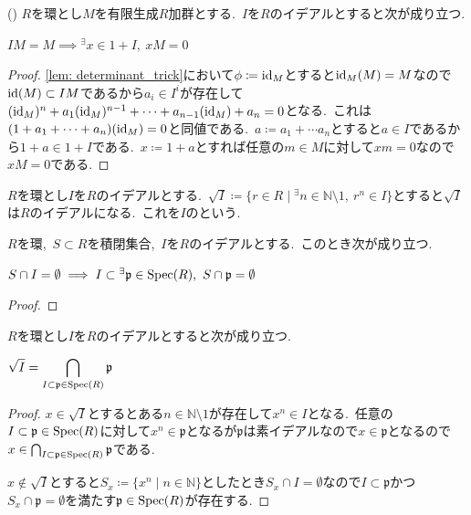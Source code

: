 \begin{theorem}() \label{thm: nakayama_lemma}
$R$を環とし$M$を有限生成$R$加群とする.\
$I$を$R$のイデアルとすると次が成り立つ.
\begin{center}
    $IM = M \implies {^{\exists}x} \in 1 + I,\ xM = 0$
\end{center}
\end{theorem}
\begin{proof}
\cref{lem: determinant_trick}において$\phi \coloneq \operatorname{id}_M$とすると$\operatorname{id}_M(M) = M$なので$\operatorname{id}(M) \subset IM$であるから$a_i \in I^i$が存在して$(\operatorname{id}_M)^n + a_1(\operatorname{id}_M)^{n-1} + \cdots + a_{n-1}(\operatorname{id}_M) + a_n = 0$となる.\
これは$(1 + a_1 + \cdots + a_n)(\operatorname{id}_M) = 0$と同値である.\
$a \coloneq a_1 + \cdots a_n$とすると$a \in I$であるから$1 + a \in 1 + I$である.\
$x \coloneq 1 + a$とすれば任意の$m \in M$に対して$xm = 0$なので$xM = 0$である.
\end{proof}

\begin{definition}
$R$を環とし$I$を$R$のイデアルとする.\
$\sqrt{I} \coloneq \{r \in R \mid {^{\exists}n} \in \mathbb{N} \setminus 1,\ r^n \in I\}$とすると$\sqrt{I}$は$R$のイデアルになる.\
これを$I$のという.
\end{definition}

\begin{lemma}
$R$を環,\ $S \subset R$を積閉集合,\ $I$を$R$のイデアルとする.\
このとき次が成り立つ.
\begin{center}
	$S \cap I = \emptyset \implies I \subset {^{\exists} \mathfrak{p}} \in \operatorname{Spec}(R),\  S \cap \mathfrak{p} = \emptyset$
\end{center}
\end{lemma}
\begin{proof}

\end{proof}

\begin{proposition}
$R$を環とし$I$を$R$のイデアルとすると次が成り立つ.
\begin{center}
    $\displaystyle \sqrt{I} = \bigcap_{I \subset \mathfrak{p} \in \operatorname{Spec}(R)} \mathfrak{p}$
\end{center}
\end{proposition}

\begin{proof}
$x \in \sqrt{I}$とするとある$n \in \mathbb{N} \setminus 1$が存在して$x^n \in I$となる.\
任意の$I \subset \mathfrak{p} \in \operatorname{Spec}(R)$に対して$x^n \in \mathfrak{p}$となるが$\mathfrak{p}$は素イデアルなので$x \in \mathfrak{p}$となるので$x \in \bigcap_{I \subset \mathfrak{p} \in \operatorname{Spec}(R)} \mathfrak{p}$である.

$x \not\in \sqrt{I}$とすると$S_x \coloneq \{x^n \mid n \in \mathbb{N}\}$としたとき$S_x \cap I = \emptyset$なので$I \subset \mathfrak{p}$かつ$S_x \cap \mathfrak{p} = \emptyset$を満たす$\mathfrak{p} \in \operatorname{Spec}(R)$が存在する.
\end{proof}